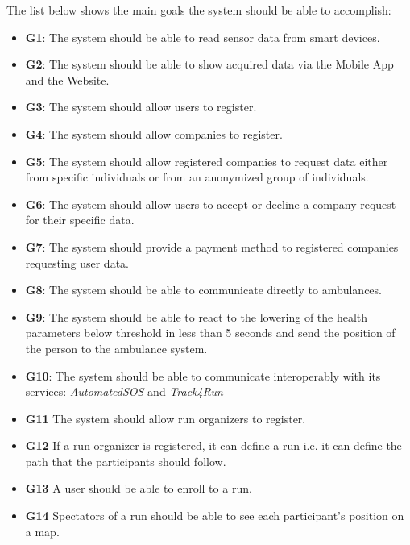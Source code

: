 The list below shows the main goals the system should be able to accomplish:

\begin{itemize}
    \item \textbf{G1}: The system should be able to read sensor data from smart devices.
    \item \textbf{G2}: The system should be able to show acquired data via the Mobile App and the Website.
    \item \textbf{G3}: The system should allow users to register.
    \item \textbf{G4}: The system should allow companies to register.
    \item \textbf{G5}: The system should allow registered companies to request data either from specific individuals or from an anonymized group of individuals.
    \item \textbf{G6}: The system should allow users to accept or decline a company request for their specific data.
    \item \textbf{G7}: The system should provide a payment method to registered companies requesting user data. %
    \item \textbf{G8}: The system should be able to communicate directly to ambulances.
    \item \textbf{G9}: The system should be able to react to the lowering of the health parameters below threshold in less than 5 seconds and send the position of the person to the ambulance system. 
    \item \textbf{G10}: The system should be able to communicate interoperably with its services: \textit{AutomatedSOS} and \textit{Track4Run}
    \item \textbf{G11} The system should allow run organizers to register.
    \item \textbf{G12} If a run organizer is registered, it can define a run i.e. it can define the path that the participants should follow.
    \item \textbf{G13} A user should be able to enroll to a run.
    \item \textbf{G14} Spectators of a run should be able to see each participant's position on a map.
\end{itemize}





